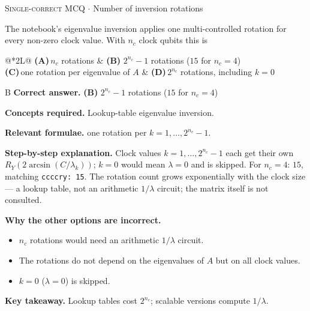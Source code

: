 \documentclass[11pt,a4paper]{article}
\newcommand{\optlabel}[1]{\textbf{(#1)}}
\newcommand{\correctlabel}[1]{\textcolor{okgreen}{\textbf{(#1)}\,\ding{51}}}
\newenvironment{qitem}[1]{\begin{list}{}{\setlength{\leftmargin}{3.3em}\setlength{\labelwidth}{3.1em}%
  \setlength{\labelsep}{0.2em}\setlength{\topsep}{3pt}\setlength{\parsep}{3pt}}\item[\textbf{Q.#1}\hfill]}{\end{list}}
\newcommand{\qsep}{\par\vspace{2pt}{\color{black!15}\hrule}\vspace{4pt}}
\newcommand{\qmeta}[2]{{\footnotesize\color{black!60}\textsc{#1} \;$\cdot$\; #2}\par}
\begin{document}
\begin{qitem}{50}
\qmeta{Single-correct MCQ}{Number of inversion rotations}
The notebook's eigenvalue inversion applies one multi-controlled rotation for every non-zero clock value. With $n_c$ clock qubits this is
\par\smallskip\noindent\begin{tabularx}{\linewidth}{@{}*{2}{L}@{}}
\optlabel{A}\,$n_c$ rotations & \correctlabel{B}\,$2^{n_c} - 1$ rotations ($15$ for $n_c = 4$) \\[3pt]
\optlabel{C}\,one rotation per eigenvalue of $A$ & \optlabel{D}\,$2^{n_c}$ rotations, including $k = 0$
\end{tabularx}
\end{qitem}
\begin{solbox}{B}
\textbf{\color{brand}Correct answer.} \textcolor{okgreen}{\textbf{(B)}} $2^{n_c} - 1$ rotations ($15$ for $n_c = 4$)

\textbf{\color{brand}Concepts required.} Lookup-table eigenvalue inversion.

\textbf{\color{brand}Relevant formulae.} one rotation per $k = 1, \dots, 2^{n_c} - 1$.

\textbf{\color{brand}Step-by-step explanation.} Clock values $k = 1, \dots, 2^{n_c} - 1$ each get their own $R_Y(2\arcsin(C/\lambda_k))$; $k = 0$ would mean $\lambda = 0$ and is skipped. For $n_c = 4$: $15$, matching \texttt{ccccry: 15}.
The rotation count grows exponentially with the clock size --- a lookup table, not an arithmetic $1/\lambda$ circuit; the matrix itself is not consulted.

\textbf{\color{brand}Why the other options are incorrect.}
\begin{itemize}[leftmargin=2.4em, itemsep=1pt, topsep=2pt]
\item[\textbf{(A)}] $n_c$ rotations would need an arithmetic $1/\lambda$ circuit.
\item[\textbf{(C)}] The rotations do not depend on the eigenvalues of $A$ but on all clock values.
\item[\textbf{(D)}] $k = 0$ ($\lambda = 0$) is skipped.
\end{itemize}
\textbf{\color{brand}Key takeaway.} Lookup tables cost $2^{n_c}$; scalable versions compute $1/\lambda$.
\end{solbox}
\qsep
\end{document}
